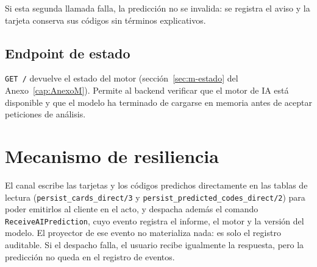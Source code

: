 Si esta segunda llamada falla, la predicción no se invalida: se registra el aviso y la tarjeta conserva sus códigos sin términos explicativos.

\subsection{Endpoint de estado}

\texttt{GET /} devuelve el estado del motor (sección~\ref{sec:m-estado} del Anexo~\ref{cap:AnexoM}). Permite al backend verificar que el motor de IA está disponible y que el modelo ha terminado de cargarse en memoria antes de aceptar peticiones de análisis.

\section{Mecanismo de resiliencia}

El canal escribe las tarjetas y los códigos predichos directamente en las tablas de lectura (\texttt{persist\_cards\_direct/3} y \texttt{persist\_predicted\_codes\_direct/2}) para poder emitirlos al cliente en el acto, y despacha además el comando \texttt{ReceiveAIPrediction}, cuyo evento registra el informe, el motor y la versión del modelo. El proyector de ese evento no materializa nada: es solo el registro auditable. Si el despacho falla, el usuario recibe igualmente la respuesta, pero la predicción no queda en el registro de eventos.
